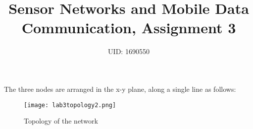 \documentclass[11pt,journal]{article}
\begin{document}
	\title{Sensor Networks and Mobile Data Communication, Assignment 3}
	
	\author{UID: 1690550}%
	



	
	
	\maketitle
	
	
	
	
	\section{}
	The three nodes are arranged in the x-y plane, along a single line as follows:
	\begin{figure}[h]
		\centering
		\texttt{[image: lab3topology2.png]}
		\caption{Topology of the network}
	\end{figure}
\pagebreak
\end{document}
